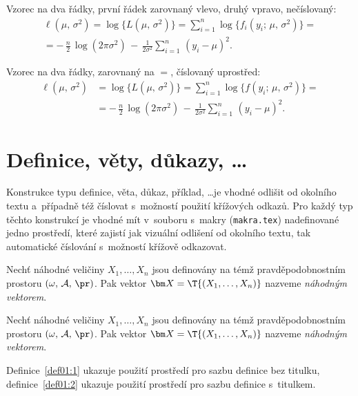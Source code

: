 Vzorec na dva řádky, první řádek zarovnaný vlevo, druhý vpravo, nečíslovaný:
\begin{multline*}
  \ell(\mu,\,\sigma^2) = \log\bigl\{L(\mu,\,\sigma^2)\bigr\} =
  \sum_{i=1}^n \log\bigl\{f_i(y_i;\,\mu,\,\sigma^2)\bigr\}= \\
  = -\,\frac{n}{2}\,\log(2\pi\sigma^2) \,-\,
  \frac{1}{2\sigma^2}\sum_{i=1}^n\,(y_i - \mu)^2.
\end{multline*}

Vzorec na dva řádky, zarovnaný na $=$, číslovaný uprostřed:
\begin{equation}\label{eq01:ell}
  \begin{split}
    \ell(\mu,\,\sigma^2) &= \log\bigl\{L(\mu,\,\sigma^2)\bigr\} =
    \sum_{i=1}^n \log\bigl\{f(y_i;\,\mu,\,\sigma^2)\bigr\}= \\
    & = -\,\frac{n}{2}\,\log(2\pi\sigma^2) \,-\,
    \frac{1}{2\sigma^2}\sum_{i=1}^n\,(y_i - \mu)^2.
  \end{split}
\end{equation}

\section{Definice, věty, důkazy, \dots}

Konstrukce typu definice, věta, důkaz, příklad, \dots je vhodné
odlišit od okolního textu a~případně též číslovat s~možností použití
křížových odkazů. Pro každý typ těchto konstrukcí je vhodné mít
v~souboru s~makry (\texttt{makra.tex}) nadefinované jedno prostředí,
které zajistí jak vizuální odlišení od okolního textu, tak
automatické číslování s~možností křížově odkazovat.

\begin{definice}
  Nechť náhodné veličiny $X_1,\dots,X_n$ jsou definovány na témž
  prav\-dě\-po\-dob\-nost\-ním prostoru $(\omega,\,\mathcal{A},\,\pr)$. Pak
  vektor $\bm X = \T{(X_1,\dots,X_n)}$ nazveme \emph{náhodným
    vektorem}.
\end{definice}

\begin{definice}
  Nechť náhodné veličiny $X_1,\dots,X_n$ jsou definovány na témž
  pravděpodobnostním prostoru $(\omega,\,\mathcal{A},\,\pr)$. Pak
  vektor $\bm X = \T{(X_1,\dots,X_n)}$ nazveme \emph{náhodným
    vektorem}.
\end{definice}
Definice~\ref{def01:1} ukazuje použití prostředí pro sazbu definice
bez titulku, definice~\ref{def01:2} ukazuje použití prostředí pro
sazbu definice s~titulkem.

